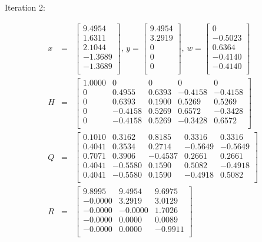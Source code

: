 Iteration 2:

\begin{eqnarray}
  x &=&
  \begin{bmatrix}
    9.4954 \\
    1.6311 \\
    2.1044 \\
   -1.3689 \\
   -1.3689 \\
  \end{bmatrix}
  \text{, }
  y = 
  \begin{bmatrix}
    9.4954 \\
    3.2919 \\
         0 \\
         0 \\
         0 \\
  \end{bmatrix}
  \text{, }
  w = 
  \begin{bmatrix}
         0 \\
   -0.5023 \\
    0.6364 \\
   -0.4140 \\
   -0.4140 \\
  \end{bmatrix}
  \\
  H &=& 
  \begin{bmatrix}
    1.0000  &       0 &        0 &        0 &        0 \\
         0  &  0.4955 &   0.6393 &  -0.4158 &  -0.4158 \\
         0  &  0.6393 &   0.1900 &   0.5269 &   0.5269 \\
         0  & -0.4158 &   0.5269 &   0.6572 &  -0.3428 \\
         0  & -0.4158 &   0.5269 &  -0.3428 &   0.6572 \\
  \end{bmatrix}
  \\
  Q &=&
  \begin{bmatrix}
    0.1010 &   0.3162 &   0.8185 &  0.3316 &   0.3316 \\
    0.4041 &   0.3534 &   0.2714 &  -0.5649 &  -0.5649 \\
    0.7071 &   0.3906 &  -0.4537 &  0.2661  &  0.2661 \\
    0.4041 &  -0.5580 &   0.1590 &   0.5082 & -0.4918 \\
    0.4041 &  -0.5580 &   0.1590 &  -0.4918 &   0.5082 \\
  \end{bmatrix}
  \\
  R &=& 
  \begin{bmatrix}
    9.8995 &   9.4954 &   9.6975 \\
   -0.0000 &   3.2919 &   3.0129 \\
   -0.0000 &  -0.0000 &   1.7026 \\ 
   -0.0000 &   0.0000 &   0.0089 \\
   -0.0000 &   0.0000 &  -0.9911 \\
  \end{bmatrix}
\end{eqnarray}

